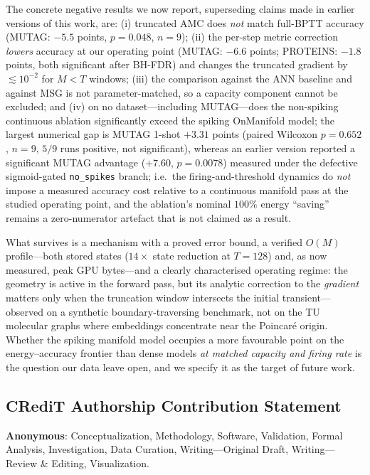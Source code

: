\documentclass[a4paper,fleqn]{cas-dc}
\begin{document}
The concrete negative results we now report, superseding claims made in earlier versions of this work, are: (i) truncated AMC does \emph{not} match full-BPTT accuracy (MUTAG: $-5.5$ points, $p{=}0.048$, $n{=}9$); (ii) the per-step metric correction \emph{lowers} accuracy at our operating point (MUTAG: $-6.6$ points; PROTEINS: $-1.8$ points, both significant after BH-FDR) and changes the truncated gradient by $\lesssim10^{-2}$ for $M<T$ windows; (iii) the comparison against the ANN baseline and against MSG is not parameter-matched, so a capacity component cannot be excluded; and (iv) on no dataset---including MUTAG---does the non-spiking continuous ablation significantly exceed the spiking OnManifold model; the largest numerical gap is MUTAG 1-shot $+3.31$ points (paired Wilcoxon $p{=}0.652$, $n{=}9$, $5/9$ runs positive, not significant), whereas an earlier version reported a significant MUTAG advantage ($+7.60$, $p{=}0.0078$) measured under the defective sigmoid-gated \texttt{no\_spikes} branch; i.e.\ the firing-and-threshold dynamics do \emph{not} impose a measured accuracy cost relative to a continuous manifold pass at the studied operating point, and the ablation's nominal $100\%$ energy ``saving'' remains a zero-numerator artefact that is not claimed as a result.

What survives is a mechanism with a proved error bound, a verified $O(M)$ profile---both stored states ($14\times$ state reduction at $T{=}128$) and, as now measured, peak GPU bytes---and a clearly characterised operating regime: the geometry is active in the forward pass, but its analytic correction to the \emph{gradient} matters only when the truncation window intersects the initial transient---observed on a synthetic boundary-traversing benchmark, not on the TU molecular graphs where embeddings concentrate near the Poincar\'e origin. Whether the spiking manifold model occupies a more favourable point on the energy--accuracy frontier than dense models \emph{at matched capacity and firing rate} is the question our data leave open, and we specify it as the target of future work.

\subsection*{CRediT Authorship Contribution Statement}
\textbf{Anonymous}: Conceptualization, Methodology, Software, Validation, Formal Analysis, Investigation, Data Curation, Writing---Original Draft, Writing---Review \& Editing, Visualization.
\end{document}
